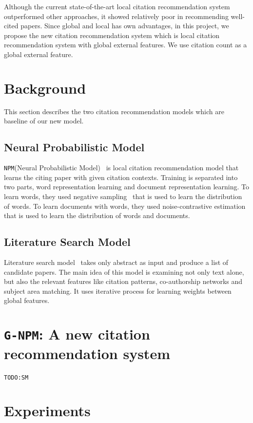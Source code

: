 \documentclass{llncs}
\newcommand{\name}{\texttt{G-NPM}\xspace}
\newcommand{\npm}{\texttt{NPM}\xspace}
\newcommand{\todo}[1]{\texttt{\color{red}TODO:#1}}
\begin{document}
Although the current state-of-the-art local citation recommendation system~\cite{Huang:2015:NPM:2886521.2886655} outperformed other approaches, it showed relatively poor in recommending well-cited papers. Since global and local has own advantages, in this project, we propose the new citation recommendation system which is local citation recommendation system with global external features. We use citation count as a global external feature.


\section{Background}
This section describes the two citation recommendation models which are baseline of our new model.

\subsection{Neural Probabilistic Model}
\npm(Neural Probabilistic Model)~\cite{Huang:2015:NPM:2886521.2886655} is local citation recommendation model that learns the citing paper with given citation contexts. Training is separated into two parts, word representation learning and document representation learning. To learn words, they used negative sampling~\cite{mikolov2013distributed} that is used to learn the distribution of words. To learn documents with words, they used noise-contrastive estimation~\cite{gutmann2010noise} that is used to learn the distribution of words and documents.

\subsection{Literature Search Model}
Literature search model~\cite{Bethard:2010:ICL:1871437.1871517} takes only abstract as input and produce a list of candidate papers. The main idea of this model is examining not only text alone, but also the relevant features like citation patterns, co-authorship networks and subject area matching.
It uses iterative process for learning weights between global features.

\section{\name: A new citation recommendation system}
\todo{SM}


\section{Experiments}
\end{document}
